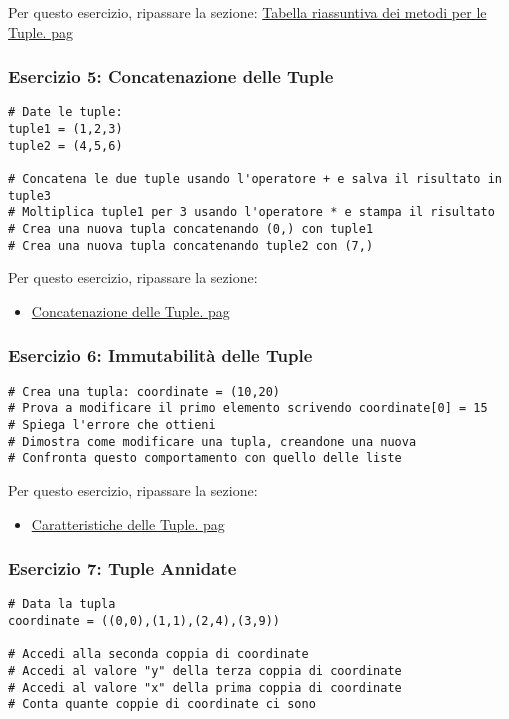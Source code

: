  Per questo esercizio, ripassare la sezione:
 \hyperref[TabellaRiassuntiMetodiTuple]{Tabella riassuntiva dei metodi per le Tuple. pag\pageref{TabellaRiassuntiMetodiTuple}}



\subsubsection{Esercizio 5: Concatenazione delle Tuple}\label{Esercizio5ConcatenazioneTuple}
\begin{lstlisting}
# Date le tuple:
tuple1 = (1,2,3)
tuple2 = (4,5,6)

# Concatena le due tuple usando l'operatore + e salva il risultato in tuple3
# Moltiplica tuple1 per 3 usando l'operatore * e stampa il risultato
# Crea una nuova tupla concatenando (0,) con tuple1
# Crea una nuova tupla concatenando tuple2 con (7,)
\end{lstlisting}
 Per questo esercizio, ripassare la sezione:
 \begin{itemize}
     \item  \hyperref[ConcatenazioneTuple]{Concatenazione delle Tuple. pag\pageref{ConcatenazioneTuple}}
 \end{itemize}

 \subsubsection{Esercizio 6: Immutabilità delle Tuple}\label{Esercizio6ImmutabilitàTuple}
 \begin{lstlisting}
# Crea una tupla: coordinate = (10,20)
# Prova a modificare il primo elemento scrivendo coordinate[0] = 15
# Spiega l'errore che ottieni
# Dimostra come modificare una tupla, creandone una nuova
# Confronta questo comportamento con quello delle liste
 \end{lstlisting}

 Per questo esercizio, ripassare la sezione:
 \begin{itemize}
     \item  \hyperref[CaratteristicheTuple]{Caratteristiche delle Tuple. pag\pageref{CaratteristicheTuple}}
 \end{itemize}



 \subsubsection{Esercizio 7: Tuple Annidate}\label{EsercizioTupleAnnidate}
 \begin{lstlisting}
# Data la tupla 
coordinate = ((0,0),(1,1),(2,4),(3,9))

# Accedi alla seconda coppia di coordinate
# Accedi al valore "y" della terza coppia di coordinate
# Accedi al valore "x" della prima coppia di coordinate
# Conta quante coppie di coordinate ci sono
 \end{lstlisting}

